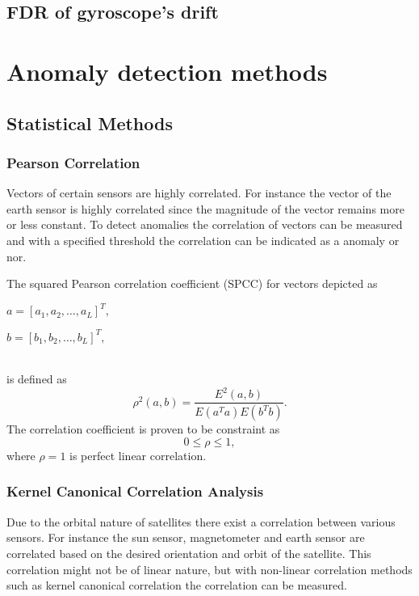 \subsection{FDR of gyroscope's drift}
\cite{carvajal2017agent}

\section{Anomaly detection methods}

\subsection{Statistical Methods}
\subsubsection{Pearson Correlation}
Vectors of certain sensors are highly correlated. For instance the vector of the earth sensor is highly correlated since the magnitude of the vector remains more or less constant. To detect anomalies the correlation of vectors can be measured and with a specified threshold the correlation can be indicated as a anomaly or nor.

The squared Pearson correlation coefficient (SPCC) for vectors depicted as
\linebreak
\\
\centerline{$a = [a_1, a_2, \ldots, a_L]^T,$}
\linebreak
\centerline{$b = [b_1, b_2, \ldots, b_L]^T,$}
\\
is defined as \cite{benesty2009pearson}
\begin{equation}
\rho^2 (a,b) = \frac{E^2 (a,b)}{E(a^Ta)E(b^Tb)}.
\end{equation}
The correlation coefficient is proven to be constraint as
\begin{equation}
0 \leq \rho \leq 1,
\end{equation}
where $\rho = 1$ is perfect linear correlation. 

\subsubsection{Kernel Canonical Correlation Analysis}
Due to the orbital nature of satellites there exist a correlation between various sensors. For instance the sun sensor, magnetometer and earth sensor are correlated based on the desired orientation and orbit of the satellite. This correlation might not be of linear nature, but with non-linear correlation methods such as kernel canonical correlation the correlation can be measured.

